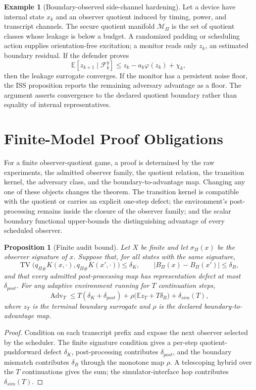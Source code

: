 \documentclass[11pt]{article}
\theoremstyle{definition}
\newtheorem{example}[definition]{Example}
\theoremstyle{plain}
\newtheorem{proposition}[definition]{Proposition}
\theoremstyle{remark}
\DeclareMathOperator{\TV}{TV}
\newcommand{\E}{\mathbb{E}}
\newcommand{\cF}{\mathcal{F}}
\newcommand{\cM}{\mathcal{M}}
\newcommand{\Adv}{\operatorname{Adv}}
\begin{document}
\begin{example}[Boundary-observed side-channel hardening]
Let a device have internal state $x_k$ and an observer quotient induced by timing, power, and transcript channels. The secure quotient manifold $\cM_\Pi$ is the set of quotient classes whose leakage is below a budget. A randomized padding or scheduling action supplies orientation-free excitation; a monitor reads only $z_k$, an estimated boundary residual. If the defender proves
\[
    \E[z_{k+1}\mid\cF_k^y]\le z_k-a_k\varphi(z_k)+\chi_k,
\]
then the leakage surrogate converges. If the monitor has a persistent noise floor, the ISS proposition reports the remaining adversary advantage as a floor. The argument asserts convergence to the declared quotient boundary rather than equality of internal representatives.
\end{example}


\section{Finite-Model Proof Obligations}

For a finite observer-quotient game, a proof is determined by the raw experiments, the admitted observer family, the quotient relation, the transition kernel, the adversary class, and the boundary-to-advantage map. Changing any one of these objects changes the theorem. The transition kernel is compatible with the quotient or carries an explicit one-step defect; the environment's post-processing remains inside the closure of the observer family; and the scalar boundary functional upper-bounds the distinguishing advantage of every scheduled observer.

\begin{proposition}[Finite audit bound]
Let $X$ be finite and let $\sigma_\Pi(x)$ be the observer signature of $x$. Suppose that, for all states with the same signature,
\[
    \TV\bigl(q_{\Pi\#}K(x,\cdot),q_{\Pi\#}K(x',\cdot)\bigr)\le \delta_K,
    \qquad
    |B_\Pi(x)-B_\Pi(x')|\le \delta_B,
\]
and that every admitted post-processing map has representation defect at most $\delta_{post}$. For any adaptive environment running for $T$ continuation steps,
\[
    \Adv_T\le T(\delta_K+\delta_{post})+\rho\!\bigl(\E z_T+T\delta_B\bigr)+\delta_{sim}(T),
\]
where $z_T$ is the terminal boundary surrogate and $\rho$ is the declared boundary-to-advantage map.
\end{proposition}

\begin{proof}
Condition on each transcript prefix and expose the next observer selected by the scheduler. The finite signature condition gives a per-step quotient-pushforward defect $\delta_K$, post-processing contributes $\delta_{post}$, and the boundary mismatch contributes $\delta_B$ through the monotone map $\rho$. A telescoping hybrid over the $T$ continuations gives the sum; the simulator-interface hop contributes $\delta_{sim}(T)$.
\end{proof}
\end{document}
